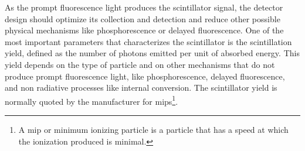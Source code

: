 As the prompt fluorescence light produces the scintillator signal, the detector design should optimize its collection and detection and reduce other possible physical mechanisms like phosphorescence or delayed fluorescence. One of the most important parameters that characterizes the scintillator is the scintillation yield, defined as the number of photons emitted per unit of absorbed energy. This yield depends on the type of particle and on other mechanisms that do not produce prompt fluorescence light, like phosphorescence, delayed fluorescence, and non radiative processes like internal conversion. The scintillator yield is normally quoted by the manufacturer for mips\footnote{A mip or minimum ionizing particle is a particle that has a speed at which the ionization produced is minimal.}.
